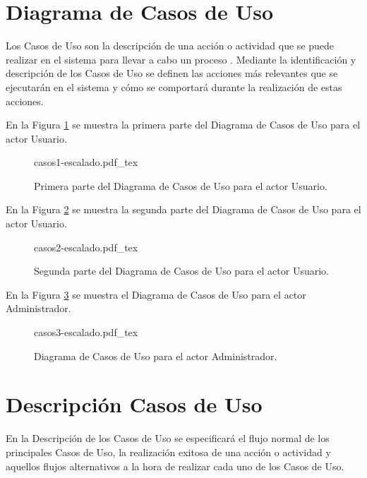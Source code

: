 \section{Diagrama de Casos de Uso}
Los Casos de Uso son la descripción de una acción o actividad que se puede realizar en el sistema para llevar a cabo un proceso \cite{casos-uso}. Mediante la identificación y descripción de los Casos de Uso se definen las acciones más relevantes que se ejecutarán en el sistema y cómo se comportará durante la realización de estas acciones.

En la Figura \ref{fig:casos-uso-usuario-1}  se muestra la primera parte del Diagrama de Casos de Uso para el actor Usuario.


\begin{figure}
   \centering
   \begin{normalsize}
       {casos1-escalado.pdf_tex}
   \end{normalsize}
   \caption{Primera parte del Diagrama de Casos de Uso para el actor Usuario.}
    \label{fig:casos-uso-usuario-1}

\end{figure}

En la Figura \ref{fig:casos-uso-usuario-2}  se muestra la segunda parte del Diagrama de Casos de Uso para el actor Usuario.


\begin{figure}
   \centering
   \begin{normalsize}
       {casos2-escalado.pdf_tex}
   \end{normalsize}
   \caption{Segunda parte del Diagrama de Casos de Uso para el actor Usuario.}
    \label{fig:casos-uso-usuario-2}

\end{figure}

En la Figura \ref{fig:casos-uso-admin}  se muestra el Diagrama de Casos de Uso para el actor Administrador.


\begin{figure}
   \centering
   \begin{normalsize}
       {casos3-escalado.pdf_tex}
   \end{normalsize}
   \caption{Diagrama de Casos de Uso para el actor Administrador.}
    \label{fig:casos-uso-admin}

\end{figure}






\section{Descripción Casos de Uso}
 En la Descripción de los Casos de Uso se especificará el flujo normal de los principales Casos de Uso, la realización exitosa de una acción o actividad y aquellos flujos alternativos a la hora de realizar cada uno de los Casos de Uso.



